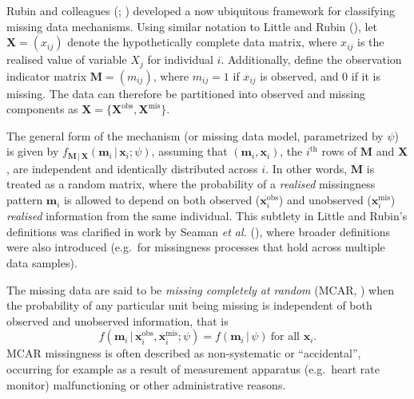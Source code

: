 \documentclass[
  letterpaper,
  paper=240mm:170mm,
  twoside=true,
  open=right,
  fontsize=10pt,
  pagesize=false,
  BCOR=15mm,
  DIV=14,
  headinclude=true,
  footinclude=false,
  headsepline=on]{scrbook}
\newcommand{\given}{\,|\,}
\begin{document}
Rubin and colleagues (; )
developed a now ubiquitous framework for classifying missing data
mechanisms. Using similar notation to Little and Rubin
(), let
\(\mathbf{X}=(x_{ij})\) denote the hypothetically complete data matrix,
where \(x_{ij}\) is the realised value of variable \(X_j\) for
individual \(i\). Additionally, define the observation indicator matrix
\(\mathbf{M} = (m_{ij})\), where \(m_{ij} = 1\) if \(x_{ij}\) is
observed, and 0 if it is missing. The data can therefore be partitioned
into observed and missing components as
\(\mathbf{X} = \{\mathbf{X}^{\text{obs}},\mathbf{X}^{\text{mis}}\}\).

The general form of the mechanism (or missing data model, parametrized
by \(\psi\)) is given by
\(f_{\mathbf{M} \given \mathbf{X}}(\mathbf{m}_i \given \mathbf{x}_i;\psi)\),
assuming that \((\mathbf{m}_i,\mathbf{x}_i)\), the \(i^{\text{th}}\)
rows of \(\mathbf{M}\) and \(\mathbf{X}\), are independent and
identically distributed across \(i\). In other words, \(\mathbf{M}\) is
treated as a random matrix, where the probability of a \emph{realised}
missingness pattern \(\mathbf{m}_i\) is allowed to depend on both
observed (\(\mathbf{x}_i^{\text{obs}}\)) and unobserved
(\(\mathbf{x}_i^{\text{mis}}\)) \emph{realised} information from the
same individual. This subtlety in Little and Rubin's definitions was
clarified in work by Seaman \emph{et al.}
(), where broader
definitions were also introduced (e.g.~for missingness processes that
hold across multiple data samples).

The missing data are said to be \emph{missing completely at random}
(MCAR, ) when the probability of any particular unit being
missing is independent of both observed and unobserved information, that
is \[
f(\mathbf{m}_i \given \mathbf{x}_i^{\text{obs}},\mathbf{x}_i^{\text{mis}};\psi) = f(\mathbf{m}_i \given \psi)  \ \text{for all } \mathbf{x}_i.
\] MCAR missingness is often described as non-systematic or
``accidental'', occurring for example as a result of measurement
apparatus (e.g.~heart rate monitor) malfunctioning or other
administrative reasons.
\end{document}
